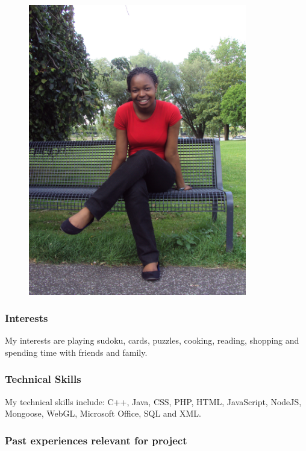 \documentclass[hidelinks, 12pt, oneside]{article}
\begin{document}
\begin{figure}[h!]
  \centering
    \includegraphics[width=0.85\textwidth]{Semaka} 
\end{figure}

\subsubsection{Interests}

My interests are playing sudoku, cards, puzzles, cooking, reading, shopping and spending time with friends and family.

\subsubsection{Technical Skills}

My technical skills include: C++, Java, CSS, PHP, HTML, JavaScript, NodeJS, Mongoose, WebGL, Microsoft Office, SQL and XML.
 
\subsubsection{Past experiences relevant for project}
\end{document}
